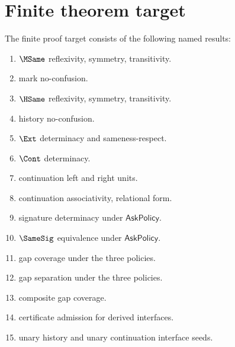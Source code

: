 \section{Finite theorem target}

The finite proof target consists of the following named results:
\begin{enumerate}[label=\textbf{T\arabic*.}]
\item \(\MSame\) reflexivity, symmetry, transitivity.
\item mark no-confusion.
\item \(\HSame\) reflexivity, symmetry, transitivity.
\item history no-confusion.
\item \(\Ext\) determinacy and sameness-respect.
\item \(\Cont\) determinacy.
\item continuation left and right units.
\item continuation associativity, relational form.
\item signature determinacy under \(\mathsf{AskPolicy}\).
\item \(\SameSig\) equivalence under \(\mathsf{AskPolicy}\).
\item gap coverage under the three policies.
\item gap separation under the three policies.
\item composite gap coverage.
\item certificate admission for derived interfaces.
\item unary history and unary continuation interface seeds.
\end{enumerate}
